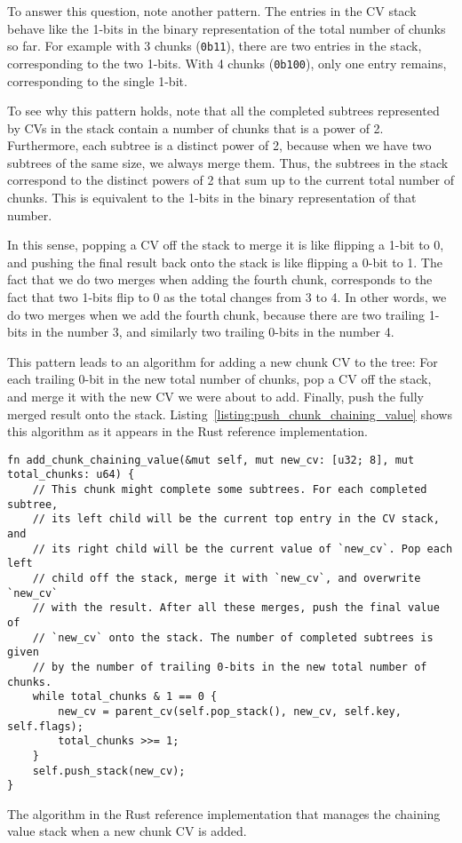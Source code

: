 \documentclass[11pt,notitlepage,a4paper]{article}
\begin{document}
To answer this question, note another pattern. The entries in the CV stack
behave like the 1-bits in the binary representation of the total number of
chunks so far. For example with 3 chunks (\texttt{0b11}), there are two entries in the
stack, corresponding to the two 1-bits. With 4 chunks (\texttt{0b100}), only one entry
remains, corresponding to the single 1-bit.

To see why this pattern holds, note that all the completed subtrees represented
by CVs in the stack contain a number of chunks that is a power of 2.
Furthermore, each subtree is a distinct power of 2, because when we have two
subtrees of the same size, we always merge them. Thus, the subtrees in the
stack correspond to the distinct powers of 2 that sum up to the current total
number of chunks. This is equivalent to the 1-bits in the binary representation
of that number.

In this sense, popping a CV off the stack to merge it is like flipping a 1-bit
to 0, and pushing the final result back onto the stack is like flipping a 0-bit
to 1. The fact that we do two merges when adding the fourth chunk, corresponds
to the fact that two 1-bits flip to 0 as the total changes from 3 to 4. In
other words, we do two merges when we add the fourth chunk, because there are
two trailing 1-bits in the number 3, and similarly two trailing 0-bits in the
number 4.

This pattern leads to an algorithm for adding a new chunk CV to the tree: For
each trailing 0-bit in the new total number of chunks, pop a CV off the stack,
and merge it with the new CV we were about to add. Finally, push the fully
merged result onto the stack. Listing~\ref{listing:push_chunk_chaining_value}
shows this algorithm as it appears in the Rust reference implementation.

\begin{listing}[h]
\begin{verbatim}
fn add_chunk_chaining_value(&mut self, mut new_cv: [u32; 8], mut total_chunks: u64) {
    // This chunk might complete some subtrees. For each completed subtree,
    // its left child will be the current top entry in the CV stack, and
    // its right child will be the current value of `new_cv`. Pop each left
    // child off the stack, merge it with `new_cv`, and overwrite `new_cv`
    // with the result. After all these merges, push the final value of
    // `new_cv` onto the stack. The number of completed subtrees is given
    // by the number of trailing 0-bits in the new total number of chunks.
    while total_chunks & 1 == 0 {
        new_cv = parent_cv(self.pop_stack(), new_cv, self.key, self.flags);
        total_chunks >>= 1;
    }
    self.push_stack(new_cv);
}
\end{verbatim}
\caption{The algorithm in the Rust reference implementation that manages the
    chaining value stack when a new chunk CV is added.}
\label{listing:push_chunk_chaining_value}
\end{listing}
\end{document}
